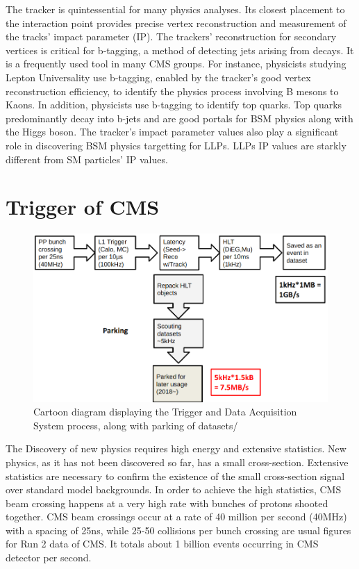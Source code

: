 The tracker is quintessential for many physics analyses.
Its closest placement to the interaction point provides precise vertex reconstruction and measurement of the tracks' impact parameter (IP).
The trackers' reconstruction for secondary vertices is critical for b-tagging, a method of detecting jets arising from \PQb decays.
It is a frequently used tool in many CMS groups.
For instance, physicists studying Lepton Universality use b-tagging, enabled by the tracker's good vertex reconstruction efficiency, to identify the physics process involving B mesons to Kaons.
In addition, physicists use b-tagging to identify top quarks.
Top quarks predominantly decay into b-jets and are good portals for BSM physics along with the Higgs boson.
The tracker's impact parameter values also play a significant role in discovering BSM physics targetting for LLPs.
LLPs IP values are starkly different from SM particles' IP values.


\section{Trigger of CMS}
\begin{figure}[h!]
	\caption{Cartoon diagram displaying the Trigger and Data Acquisition System process, along with parking of datasets/}
  \label{fig:trig}
  \centering
  \includegraphics[width=0.95\linewidth]{figs/Trig.png}
\end{figure}
The Discovery of new physics requires high energy and extensive statistics.
New physics, as it has not been discovered so far, has a small cross-section.
Extensive statistics are necessary to confirm the existence of the small cross-section signal over standard model backgrounds.
In order to achieve the high statistics, CMS beam crossing happens at a very high rate with bunches of protons shooted together.
CMS beam crossings occur at a rate of 40 million per second (40MHz) with a spacing of 25ns, while 25-50 collisions per bunch crossing are usual figures for Run 2 data of CMS.
It totals about 1 billion events occurring in CMS detector per second.

